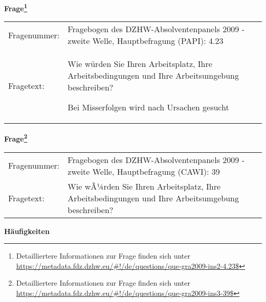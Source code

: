 				\vspace*{0.5cm}
                \noindent\textbf{Frage\footnote{Detailliertere Informationen zur Frage finden sich unter
		              \url{https://metadata.fdz.dzhw.eu/\#!/de/questions/que-gra2009-ins2-4.23$}}}\\
				\begin{tabularx}{\hsize}{@{}lX}
					Fragenummer: &
					  Fragebogen des DZHW-Absolventenpanels 2009 - zweite Welle, Hauptbefragung (PAPI):
					  4.23
 \\
					Fragetext: & Wie würden Sie Ihren Arbeitsplatz, Ihre Arbeitsbedingungen und Ihre Arbeitsumgebung beschreiben?\par  Bei Misserfolgen wird nach Ursachen gesucht \\
				\end{tabularx}
				\vspace*{0.5cm}
                \noindent\textbf{Frage\footnote{Detailliertere Informationen zur Frage finden sich unter
		              \url{https://metadata.fdz.dzhw.eu/\#!/de/questions/que-gra2009-ins3-39$}}}\\
				\begin{tabularx}{\hsize}{@{}lX}
					Fragenummer: &
					  Fragebogen des DZHW-Absolventenpanels 2009 - zweite Welle, Hauptbefragung (CAWI):
					  39
 \\
					Fragetext: & Wie wÃ¼rden Sie Ihren Arbeitsplatz, Ihre Arbeitsbedingungen und Ihre Arbeitsumgebung beschreiben? \\
				\end{tabularx}





        		\vspace*{0.5cm}
                \noindent\textbf{Häufigkeiten}


